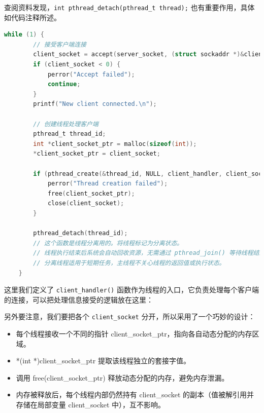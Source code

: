 \documentclass[14pt,a4paper,UTF8,twoside]{article}
\begin{document}
查阅资料发现，\texttt{int pthread\_detach(pthread\_t thread);} 也有重要作用，具体如代码注释所述。

\begin{lstlisting}[language=C, title={Thread Creation}]
    while (1) {
        // 接受客户端连接
        client_socket = accept(server_socket, (struct sockaddr *)&client_addr, &client_addr_len);
        if (client_socket < 0) {
            perror("Accept failed");
            continue;
        }
        printf("New client connected.\n");

        // 创建线程处理客户端
        pthread_t thread_id;
        int *client_socket_ptr = malloc(sizeof(int));
        *client_socket_ptr = client_socket;

        if (pthread_create(&thread_id, NULL, client_handler, client_socket_ptr) != 0) {
            perror("Thread creation failed");
            free(client_socket_ptr);
            close(client_socket);
        }

        pthread_detach(thread_id); 
        // 这个函数是线程分离用的。将线程标记为分离状态。
        // 线程执行结束后系统会自动回收资源，无需通过 pthread_join() 等待线程结束。
        // 分离线程适用于短期任务，主线程不关心线程的返回值或执行状态。
    }
\end{lstlisting}

这里我们定义了 \texttt{client\_handler()} 函数作为线程的入口，它负责处理每个客户端的连接，可以把处理信息接受的逻辑放在这里：

另外要注意，我们要把各个 \texttt{client\_socket} 分开，所以采用了一个巧妙的设计：

\begin{ans}{}{}
\begin{itemize}
    \item 每个线程接收一个不同的指针 client\_socket\_ptr，指向各自动态分配的内存区域。
    \item *(int *)client\_socket\_ptr 提取该线程独立的套接字值。
    \item 调用 free(client\_socket\_ptr) 释放动态分配的内存，避免内存泄漏。
    \item 内存被释放后，每个线程内部仍然持有 client\_socket 的副本（值被解引用并存储在局部变量 client\_socket 中），互不影响。
\end{itemize}
\end{ans}
\end{document}
